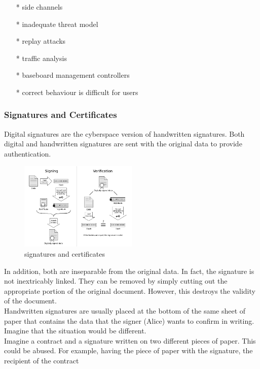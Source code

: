 \begin{enumerate}[]
    \item[*] side channels
    \item[*] inadequate threat model
    \item[*] replay attacks
    \item[*] traﬃc analysis
    \item[*] baseboard management controllers
    \item[*] correct behaviour is diﬃcult for users
\end{enumerate}

\subsubsection{Signatures and Certiﬁcates}\cite{b38}
Digital signatures are the cyberspace version of handwritten signatures. Both digital and 
handwritten signatures are sent with the original data to provide authentication.
\begin{figure}[H] %
    \centering %
    \includegraphics[width=0.5\textwidth]{figures/signature.png} %
    \caption{signatures and certificates} %
    \label{Fig.2: Signatures and Certificates} %
\end{figure}
In addition, both are inseparable from the original data. In fact, the signature is not 
inextricably linked. They can be removed by simply cutting out the appropriate portion of 
the original document. However, this destroys the validity of the document.
\\
Handwritten signatures are usually placed at the bottom of the same sheet of paper that 
contains the data that the signer (Alice) wants to confirm in writing. Imagine that the 
situation would be different.
\\
Imagine a contract and a signature written on two different pieces of paper. This could 
be abused. For example, having the piece of paper with the signature, the recipient of the contract
